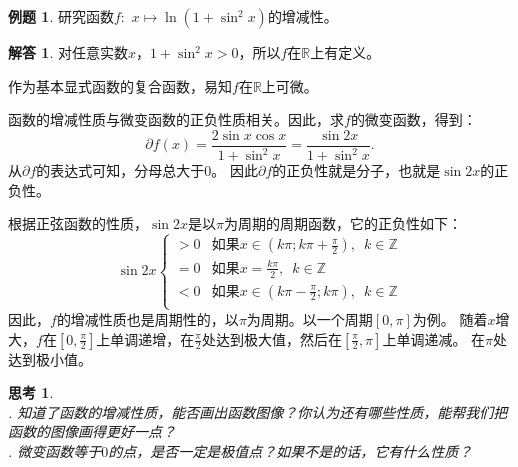 \documentclass[12pt,UTF8]{ctexbook}
\theoremstyle{definition}
\newtheorem{et}{例题}[section]
\newtheorem*{so}{解答}
\theoremstyle{plain}
\newtheorem{sk}{思考}[section]
\begin{document}
\begin{et}
    研究函数$f:\,\,x\mapsto \ln(1 + \sin^2{x})$的增减性。
\end{et}

\begin{so}
    对任意实数$x$，$1 + \sin^2{x} > 0$，所以$f$在$\mathbb{R}$上有定义。

    作为基本显式函数的复合函数，易知$f$在$\mathbb{R}$上可微。

    函数的增减性质与微变函数的正负性质相关。因此，求$f$的微变函数，得到：
    $$ \partial f(x) = \frac{2\sin{x}\cos{x}}{1 + \sin^2{x}} = \frac{\sin{2x}}{1 + \sin^2{x}}.$$
    从$ \partial f $的表达式可知，分母总大于$0$。
    因此$ \partial f $的正负性就是分子，也就是$\sin{2x}$的正负性。

    根据正弦函数的性质，$\sin{2x}$是以$\pi$为周期的周期函数，它的正负性如下：
    $$ \sin{2x} \left\{
        \begin{array}{cl}
            > 0 & \mbox{如果}x \in (k\pi; k\pi + \frac{\pi}{2}),\,\,\, k\in\mathbb{Z} \\
            = 0 & \mbox{如果}x = \frac{k\pi}{2}, \,\,\,k\in\mathbb{Z} \\
            < 0 & \mbox{如果}x \in (k\pi - \frac{\pi}{2}; k\pi), \,\,\,k\in\mathbb{Z} \\
        \end{array}\right.
    $$
    因此，$f$的增减性质也是周期性的，以$\pi$为周期。以一个周期$[0, \pi]$为例。
    随着$x$增大，$f$在$[0, \frac{\pi}{2}]$上单调递增，在$\frac{\pi}{2}$处达到极大值，然后在$[\frac{\pi}{2}, \pi]$上单调递减。
    在$\pi$处达到极小值。
    
\end{so}

\begin{sk}
    \mbox{} \\
    . 知道了函数的增减性质，能否画出函数图像？你认为还有哪些性质，能帮我们把函数的图像画得更好一点？\\
    . 微变函数等于$0$的点，是否一定是极值点？如果不是的话，它有什么性质？    
\end{sk}
\end{document}
